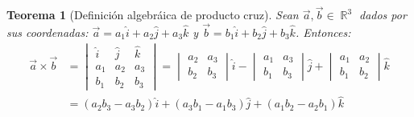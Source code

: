 \documentclass[12pt, fleqn]{report}                             %
\newtheorem{Theorem}{Teorema}[section]                          %
\DeclareMathOperator \Reals        {\mathbb{R}}                 %
\begin{document}
            	\begin{Theorem}[Definición algebráica de producto cruz]
            		Sean $\vec{a}, \vec{b} \in \Reals^3$ dados por sus coordenadas: $\vec{a}=a_1\hat{i} + a_2\hat{j} + a_3\hat{k}$ y $\vec{b}=b_1\hat{i} + b_2\hat{j} + b_3\hat{k}$. Entonces:
            		\begin{align}
	            		\vec{a} \times \vec{b} &=
	            		\begin{vmatrix}
		            		\hat{i} & \hat{j} & \hat{k}\\
		            		a_1 & a_2 & a_3\\
		            		b_1 & b_2 & b_3
	            		\end{vmatrix}
	            		= \begin{vmatrix}
	            			a_2 & a_3\\
	            			b_2 & b_3
	            		\end{vmatrix}\hat{i} - 
	            		\begin{vmatrix}
		            		a_1 & a_3\\
		            		b_1 & b_3
	            		\end{vmatrix}\hat{j} + 
	            		\begin{vmatrix}
		            		a_1 & a_2\\
		            		b_1 & b_2
	            		\end{vmatrix}\hat{k}\\
	            		&= (a_2b_3-a_3b_2)\hat{i} + (a_3b_1-a_1b_3)\hat{j} + (a_1b_2-a_2b_1)\hat{k}
            		\end{align}
            	\end{Theorem}
            
            	
\end{document}
